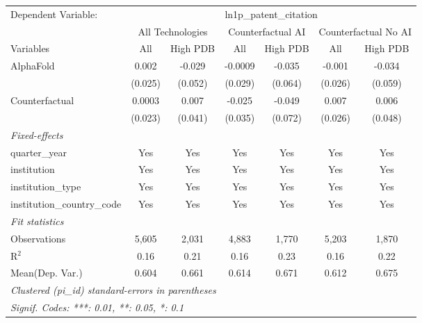 \begingroup
\centering
\begin{tabular}{lcccccc}
   \tabularnewline \midrule \midrule
   Dependent Variable: & \multicolumn{6}{c}{ln1p\_patent\_citation}\\
 & \multicolumn{2}{c}{All Technologies} & \multicolumn{2}{c}{Counterfactual AI} & \multicolumn{2}{c}{Counterfactual No AI} \\
\cmidrule(lr){1-1}\cmidrule(lr){2-3} \cmidrule(lr){4-5} \cmidrule(lr){6-7}
Variables & \multicolumn{1}{c}{All} & \multicolumn{1}{c}{High PDB} & \multicolumn{1}{c}{All} & \multicolumn{1}{c}{High PDB} & \multicolumn{1}{c}{All} & \multicolumn{1}{c}{High PDB} \\
\cmidrule(lr){1-1}\cmidrule(lr){2-2} \cmidrule(lr){3-3} \cmidrule(lr){4-4} \cmidrule(lr){5-5} \cmidrule(lr){6-6} \cmidrule(lr){7-7}
   AlphaFold                    & 0.002   & -0.029  & -0.0009 & -0.035  & -0.001  & -0.034\\   
                                & (0.025) & (0.052) & (0.029) & (0.064) & (0.026) & (0.059)\\   
   Counterfactual               & 0.0003  & 0.007   & -0.025  & -0.049  & 0.007   & 0.006\\   
                                & (0.023) & (0.041) & (0.035) & (0.072) & (0.026) & (0.048)\\   
   \midrule
   \emph{Fixed-effects}\\
   quarter\_year                & Yes     & Yes     & Yes     & Yes     & Yes     & Yes\\  
   institution                  & Yes     & Yes     & Yes     & Yes     & Yes     & Yes\\  
   institution\_type            & Yes     & Yes     & Yes     & Yes     & Yes     & Yes\\  
   institution\_country\_code   & Yes     & Yes     & Yes     & Yes     & Yes     & Yes\\  
   \midrule
   \emph{Fit statistics}\\
   Observations                 & 5,605   & 2,031   & 4,883   & 1,770   & 5,203   & 1,870\\  
   R$^2$                        & 0.16    & 0.21    & 0.16    & 0.23    & 0.16    & 0.22\\  
Mean(Dep. Var.) & 0.604 & 0.661 & 0.614 & 0.671 & 0.612 & 0.675 \\
   \midrule \midrule
   \multicolumn{7}{l}{\emph{Clustered (pi\_id) standard-errors in parentheses}}\\
   \multicolumn{7}{l}{\emph{Signif. Codes: ***: 0.01, **: 0.05, *: 0.1}}\\
\end{tabular}
\par\endgroup
